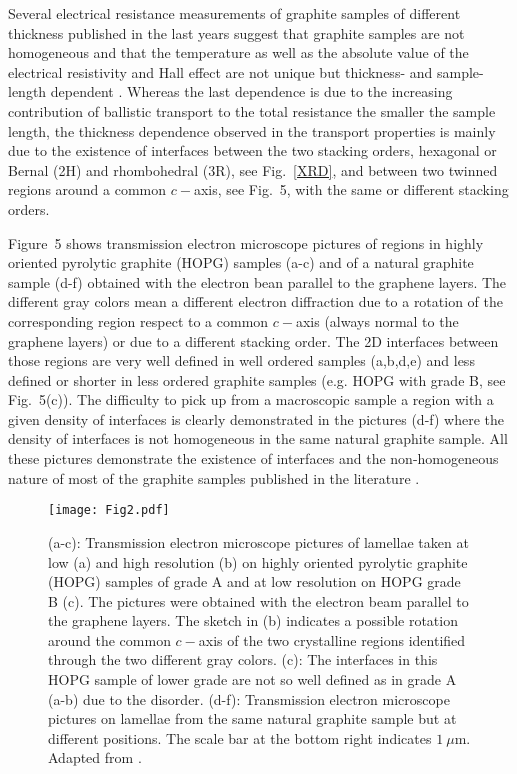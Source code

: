 \documentclass[aps,dvipsnames,twocolumn,floatfix,amsmath]{revtex4-1}
\begin{document}
Several electrical resistance measurements of graphite samples of
different thickness published in the last years suggest that
graphite samples are not homogeneous and that the temperature as
well as the absolute value of the electrical resistivity and Hall
effect are not unique but thickness-
\cite{bar08,zor17,esq14,chap7} and sample-length dependent
\cite{dus11,esq11}. Whereas the last dependence is due to the
increasing contribution of ballistic transport to the total
resistance the smaller the sample length, the thickness dependence
observed in the transport properties is mainly due to the
existence of interfaces between the two stacking orders, hexagonal
or Bernal (2H) and rhombohedral (3R), see Fig.~\ref{XRD}, and
between two twinned regions around a common $c-$axis, see Fig.~5,
with the same or different stacking orders.


Figure~5 shows transmission electron microscope pictures
of regions in highly oriented pyrolytic graphite (HOPG) samples
(a-c) and of a natural graphite sample (d-f) obtained with the
electron bean parallel to the graphene layers. The different gray
colors mean a different electron diffraction due to a rotation of
the corresponding region respect to a common $c-$axis (always
normal to the graphene layers) or due to a different stacking
order. The 2D interfaces between those regions are very well
defined in well ordered samples (a,b,d,e) and less defined or
shorter in less ordered graphite samples (e.g. HOPG with grade B,
see Fig.~5(c)). The difficulty to pick up from a
macroscopic sample a region with a given density of interfaces is
clearly demonstrated in the pictures (d-f) where the density of
interfaces is not homogeneous in the same natural graphite sample.
All these pictures demonstrate the existence of interfaces and
the non-homogeneous nature of most of the graphite samples published in the
literature \cite{chap7}.

\begin{figure}
\label{TEM}       %
\begin{center}
\texttt{[image: Fig2.pdf]}
\caption{(a-c): Transmission electron microscope pictures of
lamellae taken at low  (a) and high resolution (b) on highly
oriented pyrolytic graphite (HOPG) samples of grade A and at low
resolution on HOPG grade B (c). The pictures were obtained with
the electron beam parallel to the graphene layers. The sketch in
(b) indicates a possible rotation around the common $c-$axis of
the two crystalline regions identified through the  two different gray colors.
(c): The interfaces in this HOPG sample of lower grade are not so
well defined as in grade A (a-b) due to the disorder.
(d-f): Transmission electron microscope pictures on lamellae from the same
natural graphite sample but at different positions. The scale bar at the bottom right
indicates $1~\mu$m. Adapted from \cite{bar08,esqpip,esqarx14,pre16}.}
\end{center}
\end{figure}
%
\end{document}
